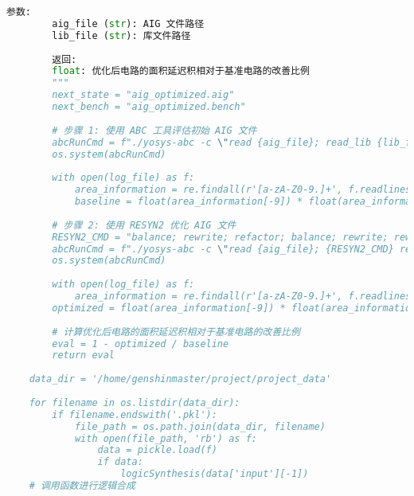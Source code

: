 \documentclass[UTF8]{ctexart}
\begin{document}
\begin{lstlisting}[language=python]
        参数:
        aig_file (str): AIG 文件路径
        lib_file (str): 库文件路径
        
        返回:
        float: 优化后电路的面积延迟积相对于基准电路的改善比例
        """
        next_state = "aig_optimized.aig"
        next_bench = "aig_optimized.bench"
    
        # 步骤 1: 使用 ABC 工具评估初始 AIG 文件
        abcRunCmd = f"./yosys-abc -c \"read {aig_file}; read_lib {lib_file}; map; topo; stime\" > {log_file}"
        os.system(abcRunCmd)
    
        with open(log_file) as f:
            area_information = re.findall(r'[a-zA-Z0-9.]+', f.readlines()[-1])
            baseline = float(area_information[-9]) * float(area_information[-4])
    
        # 步骤 2: 使用 RESYN2 优化 AIG 文件
        RESYN2_CMD = "balance; rewrite; refactor; balance; rewrite; rewrite -z; balance; refactor -z; rewrite -z; balance;"
        abcRunCmd = f"./yosys-abc -c \"read {aig_file}; {RESYN2_CMD} read_lib {lib_file}; write {next_state}; write_bench -l {next_bench}; map; topo; stime\" > {log_file}"
        os.system(abcRunCmd)
    
        with open(log_file) as f:
            area_information = re.findall(r'[a-zA-Z0-9.]+', f.readlines()[-1])
        optimized = float(area_information[-9]) * float(area_information[-4])
    
        # 计算优化后电路的面积延迟积相对于基准电路的改善比例
        eval = 1 - optimized / baseline
        return eval
    
    data_dir = '/home/genshinmaster/project/project_data'
    
    for filename in os.listdir(data_dir):
        if filename.endswith('.pkl'):
            file_path = os.path.join(data_dir, filename)
            with open(file_path, 'rb') as f:
                data = pickle.load(f)
                if data:
                    logicSynthesis(data['input'][-1])
    # 调用函数进行逻辑合成
               
\end{lstlisting} 
\end{document}
